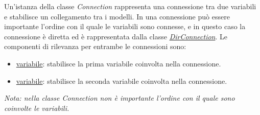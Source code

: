 
Un'istanza della classe \textit{Connection} rappresenta una connessione tra due variabili e stabilisce un collegamento tra i modelli. In una connessione può essere importante l'ordine con il quale le variabili sono connesse, e in questo caso la connessione è diretta ed è rappresentata dalla classe \hyperref[sec:modelstranslator:analysis:model_analysis:connection:dirconnection]{\textit{DirConnection}}. Le componenti di rilevanza per entrambe le connessioni sono:
\begin{itemize}
	\item \hyperref[sec:modelstranslator:analysis:model_analysis:variable]{variabile}: stabilisce la prima variabile coinvolta nella connessione.
	\item \hyperref[sec:modelstranslator:analysis:model_analysis:variable]{variabile}: stabilisce la seconda variabile coinvolta nella connessione.
\end{itemize}
\small{\textit{Nota: nella classe Connection non è importante l'ordine con il quale sono coinvolte le variabili.}}

